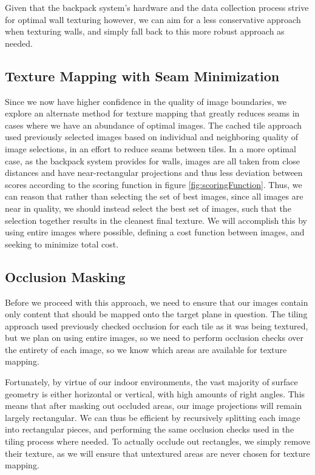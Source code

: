 \documentclass[10pt,twocolumn,letterpaper]{article}
\begin{document}
Given that the backpack system's hardware and the data collection
process strive for optimal wall texturing however, we can aim for a
less conservative approach when texturing walls, and simply fall back
to this more robust approach as needed.

\subsection{Texture Mapping with Seam Minimization}
\label{sec:seamMinimization}
Since we now have higher confidence in the quality of image
boundaries, we explore an alternate method for texture mapping that
greatly reduces seams in cases where we have an abundance of optimal
images.  The cached tile approach used previously selected images
based on individual and neighboring quality of image selections, in an
effort to reduce seams between tiles. In a more optimal case, as the
backpack system provides for walls, images are all taken from close
distances and have near-rectangular projections and thus less
deviation between scores according to the scoring function in figure
\ref{fig:scoringFunction}. Thus, we can reason that rather than
selecting the set of best images, since all images are near in
quality, we should instead select the best set of images, such that
the selection together results in the cleanest final texture. We will
accomplish this by using entire images where possible, defining a cost
function between images, and seeking to minimize total cost.

\subsection{Occlusion Masking}
\label{sec:occlusionMasking}
Before we proceed with this approach, we need to ensure that our
images contain only content that should be mapped onto the target
plane in question. The tiling approach used previously checked
occlusion for each tile as it was being textured, but we plan on using
entire images, so we need to perform occlusion checks over the
entirety of each image, so we know which areas are available for
texture mapping.

Fortunately, by virtue of our indoor environments, the vast majority
of surface geometry is either horizontal or vertical, with high
amounts of right angles. This means that after masking out occluded
areas, our image projections will remain largely rectangular. We can
thus be efficient by recursively splitting each image into rectangular
pieces, and performing the same occlusion checks used in the tiling
process where needed. To actually occlude out rectangles, we simply
remove their texture, as we will ensure that untextured areas are
never chosen for texture mapping.
\end{document}
